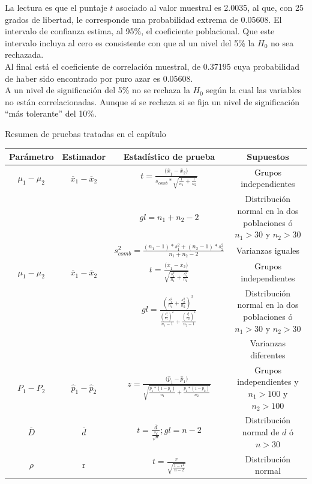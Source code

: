 \documentclass[]{book}
\begin{document}
La lectura es que el puntaje \(t\) asociado al valor muestral es 2.0035, al que, con 25 grados de libertad, le corresponde una probabilidad extrema de 0.05608. El intervalo de confianza estima, al 95\%, el coeficiente poblacional. Que este intervalo incluya al cero es consistente con que al un nivel del 5\% la \(H_0\) no sea rechazada.\\
Al final está el coeficiente de correlación muestral, de 0.37195 cuya probabilidad de haber sido encontrado por puro azar es 0.05608.\\
A un nivel de significación del 5\% no se rechaza la \(H_0\) según la cual las variables no están correlacionadas. Aunque sí se rechaza si se fija un nivel de significación ``más tolerante'' del 10\%.

Resumen de pruebas tratadas en el capítulo

\begin{table}[H]
\centering
\begin{tabular}{cccc}
\toprule
Parámetro & Estimador & Estadístico de prueba & Supuestos\\
\midrule
\rowcolor{gray!6}  $\mu_{1} - \mu_{2}$ & ${\overline{x}}_{1} - {\overline{x}}_{2}$ & $t = \frac{{(\overline{x}}_{1} - {\overline{x}}_{2})}{s_{comb}*\sqrt{\frac{1}{n_{1}} + \frac{1}{n_{2}}}}$ & Grupos independientes\\
 &  & $gl = n_{1} + n_{2} - 2$ & Distribución normal en la dos poblaciones ó $n_{1} > 30$ y $n_{2} > 30$\\
\rowcolor{gray!6}   &  & $s_{comb}^{2} = \frac{(n_{1} - 1)*s_{1}^{2} + (n_{2} - 1)*s_{2}^{2}}{n_{1} + n_{2} - 2}$ & Varianzas iguales\\
$\mu_{1} - \mu_{2}$ & ${\overline{x}}_{1} - {\overline{x}}_{2}$ & $t = \frac{{(\overline{x}}_{1} - {\overline{x}}_{2})}{\sqrt{\frac{s_{1}^{2}}{n_{1}} + \frac{s_{2}^{2}}{n_{2}}}}$ & Grupos independientes\\
\rowcolor{gray!6}   &  & $gl = \frac{( \frac{s_{1}^{2}}{n_{1}} + \frac{s_{2}^{2}}{n_{2}} )^{2}}{\frac{( \frac{s_{1}^{2}}{n_{1}} )^{2}}{n_{1} - 1} + \frac{( \frac{s_{2}^{2}}{n_{2}} )^{2}}{n_{2} - 1}}$ & Distribución normal en la dos poblaciones ó $n_{1} > 30$ y $n_{2} > 30$\\
\addlinespace
 &  &  & Varianzas diferentes\\
\rowcolor{gray!6}  $P_{1} - P_{2}$ & ${\widehat{p}}_{1} - {\widehat{p}}_{2}$ & $z = \frac{{(\widehat{p}}_{1} - {\widehat{p}}_{1})}{\sqrt{\frac{{\widehat{p}}_{1}*(1 - {\widehat{p}}_{1})}{n_{1}} + \frac{{\widehat{p}}_{2}*(1 - {\widehat{p}}_{2})}{n_{2}}}}$ & Grupos independientes y $n_{1} > 100$ y $n_{2} > 100$\\
$\overline{D}$ & $\overline{d}$ & $t = \frac{\overline{d}}{\frac{s_{d}}{\sqrt{n}}};gl = n - 2$ & Distribución normal de $d$ ó $n > 30$\\
\rowcolor{gray!6}  $\rho$ & r & $t = \frac{r}{\sqrt{\frac{1 - r^{2}}{n - 2}}}$ & Distribución normal\\
\bottomrule
\end{tabular}
\end{table}
\end{document}
